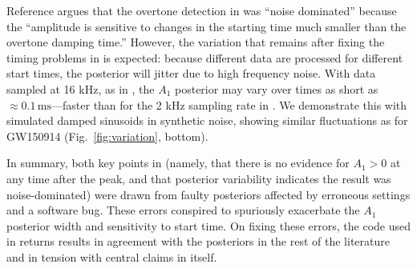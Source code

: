\documentclass[aps,prd,twocolumn,superscriptaddress,preprintnumbers,floatfix,nofootinbib]{revtex4-2}
\begin{document}
Reference \cite{Cotesta:2022pci} argues that the overtone detection in \cite{Isi:2019aib} was ``noise dominated'' because the ``amplitude is sensitive to changes in the starting time much smaller than the overtone damping time.''
However, the variation that remains after fixing the timing problems in \cite{Cotesta:2022pci} is expected: because different data are processed for different start times, the posterior will jitter due to high frequency noise.
With data sampled at 16 kHz, as in \cite{Cotesta:2022pci}, the $A_1$ posterior may vary over times as short as $\approx 0.1\, \mathrm{ms}$---faster than for the 2 kHz sampling rate in \cite{Isi:2019aib,Isi:2022mhy}.
We demonstrate this with simulated damped sinusoids in synthetic noise, showing similar fluctuations as for GW150914 (Fig.~\ref{fig:variation}, bottom).

In summary, both key points in \cite{Cotesta:2022pci} (namely, that there is no evidence for $A_1 > 0$ at any time after the peak, and that posterior variability indicates the result was noise-dominated) were drawn from faulty posteriors affected by erroneous settings and a software bug.
These errors conspired to spuriously exacerbate the $A_1$ posterior width and sensitivity to start time.
On fixing these errors, the code used in \cite{Cotesta:2022pci} returns results in agreement with the posteriors in the rest of the literature and in tension with central claims in \cite{Cotesta:2022pci} itself.


\end{document}
